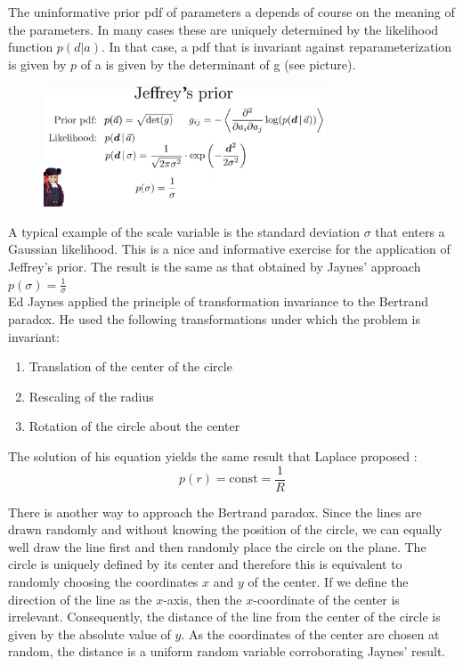 \documentclass[12pt, a4paper]{scrartcl}
\begin{document}
The uninformative prior pdf of parameters a depends of course on the
meaning of the parameters. In many cases these are uniquely determined
by the likelihood function $p(d|a)$. In that case, a pdf that is invariant against reparameterization is given by $p$ of a is given by the determinant of g (see picture).%
 \begin{figure}[H]
	\centering
	\includegraphics[width=0.75\textwidth]{8_9.png}
\end{figure}

A typical example of the scale variable is the standard deviation $\sigma$ that enters
a Gaussian likelihood. This is a nice and informative exercise for the application of Jeffrey’s prior. The result is the same as that obtained by Jaynes’
approach $p(\sigma)=\frac{1}{\sigma}$\\

Ed Jaynes applied the principle of transformation invariance to the Bertrand paradox.
He used the following transformations under which the problem is invariant:%
\begin{enumerate}
	\item Translation of the center of the circle
	\item Rescaling of the radius
	\item Rotation of the circle about the center
\end{enumerate} 
The solution of his equation yields the same result that Laplace proposed :\\
\[p(r)=\text{const}=\frac 1R\]

There is another way to approach the Bertrand paradox. Since the lines
are drawn randomly and without knowing the position of the circle, we can
equally well draw the line first and then randomly place the circle on the
plane. The circle is uniquely defined by its center and therefore this is equivalent to randomly choosing the coordinates $x$ and $y$ of the center. If we define
the direction of the line as the $x$-axis, then the $x$-coordinate of the center is
irrelevant. Consequently, the distance of the line from the center of the circle is given by the absolute value of $y$. As the coordinates of the center are
chosen at random, the distance is a uniform random variable corroborating
Jaynes' result.\\%
\end{document}
